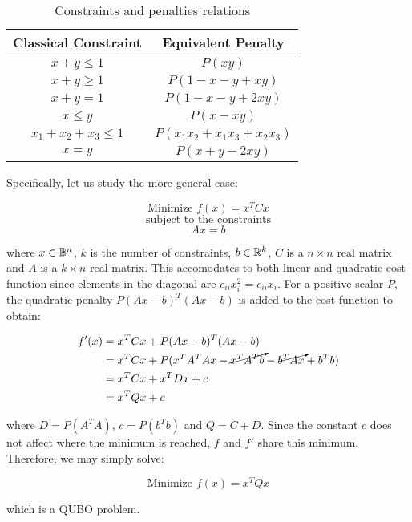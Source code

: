 \begin{table}[h]
	\centering
	\begin{tabular}{cc}
		Classical Constraint 		& Equivalent Penalty   			\\ \hline
		$x + y \leq 1$       		& $P(xy)$              			\\
		$x + y \geq 1$       		& $P(1 - x - y + xy)$  			\\
		$x + y = 1$          		& $P(1 - x - y + 2xy)$ 			\\
		$x \leq y$       			& $P(x - xy)$      
		
		   			\\
		$x_1 + x_2 + x_3 \leq 1$	& $P(x_1x_2 + x_1x_3 + x_2x_3)$	\\
		$x = y$              		& $P(x + y - 2xy)$    
	\end{tabular}
	\caption{Constraints and penalties relations}
	\label{tab:penalties-table}
\end{table}

Specifically, let us study the more general case:

$$ \text{Minimize } f(x) = x^T C x $$
$$ \text{subject to the constraints} $$
$$ Ax = b $$

where $x \in \mathbb{B}^n$, $k$ is the number of constraints, $b \in \mathbb{R}^k$, $C$ is a $n \times n$ real matrix and $A$ is a $k \times n$ real matrix. This accomodates to both linear and quadratic cost function since elements in the diagonal are $c_{ii} x_i^2 = c_{ii} x_i$. For a positive scalar $P$, the quadratic penalty $P (Ax - b)^T (Ax - b)$ is added to the cost function to obtain:

\begin{equation*}
	\begin{split}
		f'(x)	& = x^T C x + P (Ax - b)^T (Ax - b) \\
		& = x^T C x + P (x^TA^TAx - \cancelto{}{x^TA^Tb} - \cancelto{}{b^TAx} + b^Tb) \\
		& = x^T C x + x^T D x + c \\
		& = x^T Q x + c 
	\end{split}
\end{equation*}

where $D = P(A^TA)$, $c = P(b^Tb)$ and $Q = C + D$. Since the constant $c$ does not affect where the minimum is reached, $f$ and $f'$ share this minimum. Therefore, we may simply solve:

$$ \text{Minimize } f(x) = x^T Q x $$

which is a QUBO problem.

